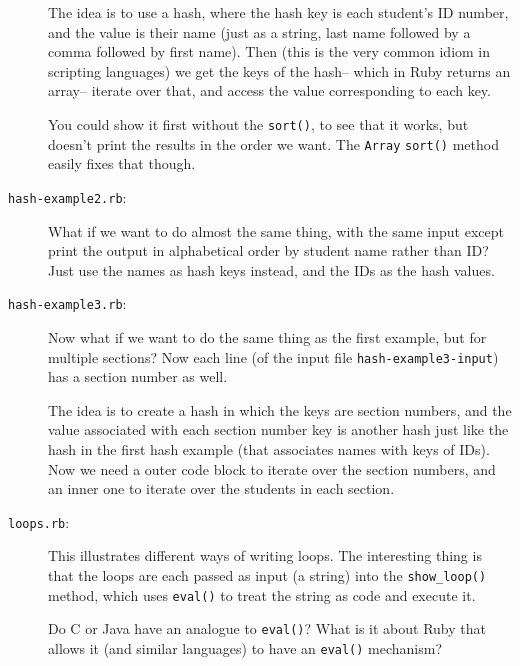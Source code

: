 \documentclass[12pt]{article}
\begin{document}
\begin{description}
              The idea is to use a hash, where the hash key is each
              student's ID number, and the value is their name (just as a
              string, last name followed by a comma followed by first name).
              Then (this is the very common idiom in scripting languages) we
              get the keys of the hash-- which in Ruby returns an array--
              iterate over that, and access the value corresponding to each
              key.

              You could show it first without the \texttt{sort()}, to see
              that it works, but doesn't print the results in the order we
              want.  The \texttt{Array} \texttt{sort()} method easily fixes
              that though.

        \item[\texttt{hash-example2.rb}:] What if we want to do almost the
              same thing, with the same input except print the output in
              alphabetical order by student name rather than ID?  Just use
              the names as hash keys instead, and the IDs as the hash
              values.

        \item[\texttt{hash-example3.rb}:] Now what if we want to do the same
              thing as the first example, but for multiple sections?  Now
              each line (of the input file \texttt{hash-example3-input}) has
              a section number as well.

              The idea is to create a hash in which the keys are section
              numbers, and the value associated with each section number key
              is another hash just like the hash in the first hash example
              (that associates names with keys of IDs).  Now we need a
              outer code block to iterate over the section numbers, and an
              inner one to iterate over the students in each section.

        \item[\texttt{loops.rb}:] This illustrates different ways of writing
              loops.  The interesting thing is that the loops are each passed
              as input (a string) into the \texttt{show\_loop()} method,
              which uses \texttt{eval()} to treat the string as code and
              execute it.

              Do C or Java have an analogue to \texttt{eval()}?  What is it
              about Ruby that allows it (and similar languages) to have an
              \texttt{eval()} mechanism?

      \end{description}
\end{document}
